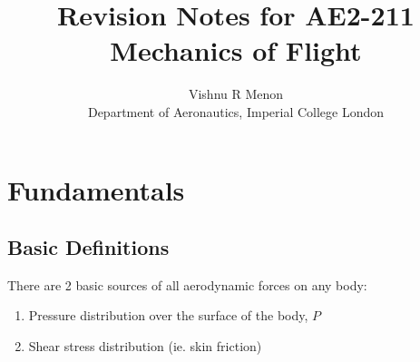 \documentclass{summary_notes}
\begin{document}
\title{Revision Notes for AE2-211 Mechanics of Flight}
\author{Vishnu R Menon\\ 
\small{Department of Aeronautics, Imperial College London}}

\maketitle
\tableofcontents

\newpage


\section{Fundamentals}

\subsection{Basic Definitions}
There are 2 basic sources of all aerodynamic forces on any body:
\begin{enumerate}
  \item Pressure distribution over the surface of the body, $P$
  \item Shear stress distribution (ie. skin friction)
\end{enumerate}
\end{document}
